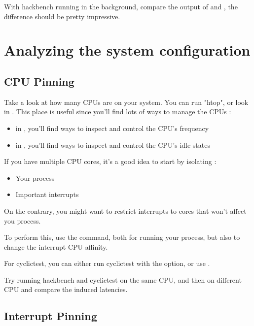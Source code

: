
With hackbench running in the background, compare the output of  and , the
difference should be pretty impressive.

\section{Analyzing the system configuration}

\subsection{CPU Pinning}

Take a look at how many CPUs are on your system. You can run "htop", or
look in . This place is useful since you'll find
lots of ways to manage the CPUs :

\begin{itemize}
	\item in , you'll find ways to inspect and control the CPU's frequency
	\item in , you'll find ways to inspect and control the CPU's idle states
\end{itemize}

If you have multiple CPU cores, it's a good idea to start by isolating :
\begin{itemize}
	\item Your process
	\item Important interrupts
\end{itemize}

On the contrary, you might want to restrict interrupts to cores that won't affect
you process.

To perform this, use the  command, both for running your process, but
also to change the interrupt CPU affinity.

For cyclictest, you can either run cyclictest with the  option,
or use .

Try running hackbench and cyclictest on the same CPU, and then on different CPU and
compare the induced latencies.

\subsection{Interrupt Pinning}

